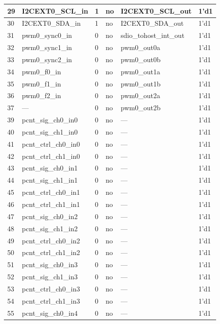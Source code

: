 \begin{longtable}[c]{|p{1cm}|p{3.8cm}|p{2.0cm}|p{2.9cm}|p{4.8cm}|p{3.0cm}| }
    29 & I2CEXT0\_SCL\_in & 1 & no & I2CEXT0\_SCL\_out & 1'd1 \\ \hline
    30 & I2CEXT0\_SDA\_in & 1 & no & I2CEXT0\_SDA\_out & 1'd1 \\ \hline
    31 & pwm0\_sync0\_in & 0 & no & sdio\_tohost\_int\_out & 1'd1 \\ \hline
    32 & pwm0\_sync1\_in & 0 & no & pwm0\_out0a & 1'd1 \\ \hline
    33 & pwm0\_sync2\_in & 0 & no & pwm0\_out0b & 1'd1 \\ \hline
    34 & pwm0\_f0\_in & 0 & no & pwm0\_out1a & 1'd1 \\ \hline
    35 & pwm0\_f1\_in & 0 & no & pwm0\_out1b & 1'd1 \\ \hline
    36 & pwm0\_f2\_in & 0 & no & pwm0\_out2a & 1'd1 \\ \hline
    37 & --- & 0 & no & pwm0\_out2b & 1'd1 \\ \hline
    39 & pcnt\_sig\_ch0\_in0 & 0 & no & --- & 1'd1 \\ \hline
    40 & pcnt\_sig\_ch1\_in0 & 0 & no & --- & 1'd1 \\ \hline
    41 & pcnt\_ctrl\_ch0\_in0 & 0 & no & --- & 1'd1 \\ \hline
    42 & pcnt\_ctrl\_ch1\_in0 & 0 & no & --- & 1'd1 \\ \hline
    43 & pcnt\_sig\_ch0\_in1 & 0 & no & --- & 1'd1 \\ \hline
    44 & pcnt\_sig\_ch1\_in1 & 0 & no &  --- & 1'd1 \\ \hline
    45 & pcnt\_ctrl\_ch0\_in1 & 0 & no & --- & 1'd1 \\ \hline
    46 & pcnt\_ctrl\_ch1\_in1 & 0 & no & --- & 1'd1 \\ \hline
    47 & pcnt\_sig\_ch0\_in2 & 0 & no & --- & 1'd1 \\ \hline
    48 & pcnt\_sig\_ch1\_in2 & 0 & no & --- & 1'd1 \\ \hline
    49 & pcnt\_ctrl\_ch0\_in2 & 0 & no & --- & 1'd1 \\ \hline
    50 & pcnt\_ctrl\_ch1\_in2 & 0 & no & --- & 1'd1 \\ \hline
    51 & pcnt\_sig\_ch0\_in3 & 0 & no &  --- & 1'd1 \\ \hline
    52 & pcnt\_sig\_ch1\_in3 & 0 & no & --- & 1'd1 \\ \hline
    53 & pcnt\_ctrl\_ch0\_in3 & 0 & no & --- & 1'd1 \\ \hline
    54 & pcnt\_ctrl\_ch1\_in3 & 0 & no & --- & 1'd1 \\ \hline
    55 & pcnt\_sig\_ch0\_in4 & 0 & no & --- & 1'd1 \\ \hline

\end{longtable}
